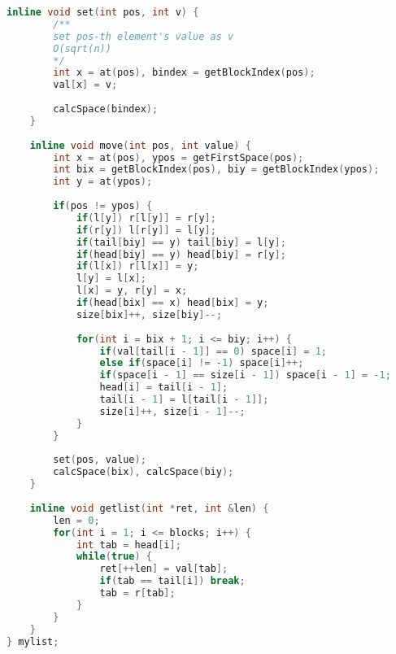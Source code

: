 \begin{lstlisting}[language=c++]
	inline void set(int pos, int v) {
		/**
		set pos-th element's value as v
		O(sqrt(n))
		*/
		int x = at(pos), bindex = getBlockIndex(pos);
		val[x] = v;
		
		calcSpace(bindex);
	}
	
	inline void move(int pos, int value) {
		int x = at(pos), ypos = getFirstSpace(pos);
		int bix = getBlockIndex(pos), biy = getBlockIndex(ypos);
		int y = at(ypos);
		
		if(pos != ypos) {
			if(l[y]) r[l[y]] = r[y];
			if(r[y]) l[r[y]] = l[y];
			if(tail[biy] == y) tail[biy] = l[y];
			if(head[biy] == y) head[biy] = r[y];
			if(l[x]) r[l[x]] = y;
			l[y] = l[x];
			l[x] = y, r[y] = x;
			if(head[bix] == x) head[bix] = y;
			size[bix]++, size[biy]--;
			
			for(int i = bix + 1; i <= biy; i++) {
				if(val[tail[i - 1]] == 0) space[i] = 1;
				else if(space[i] != -1) space[i]++;
				if(space[i - 1] == size[i - 1]) space[i - 1] = -1;
				head[i] = tail[i - 1];
				tail[i - 1] = l[tail[i - 1]];
				size[i]++, size[i - 1]--;
			}
		}
		
		set(pos, value);
		calcSpace(bix), calcSpace(biy);
	}
	
	inline void getlist(int *ret, int &len) {
		len = 0;
		for(int i = 1; i <= blocks; i++) {
			int tab = head[i];
			while(true) {
				ret[++len] = val[tab];
				if(tab == tail[i]) break;
				tab = r[tab];
			}
		}
	}
} mylist;
\end{lstlisting}

